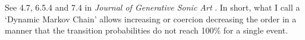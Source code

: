 
\bigskip

See  4.7, 6.5.4 and 7.4 in \textsl{Journal of Generative Sonic Art} \citep{yi}. In short, what I call a `Dynamic Markov Chain' allows increasing or coercion decreasing the order in a manner that the transition probabilities do not reach 100\% for a single event.